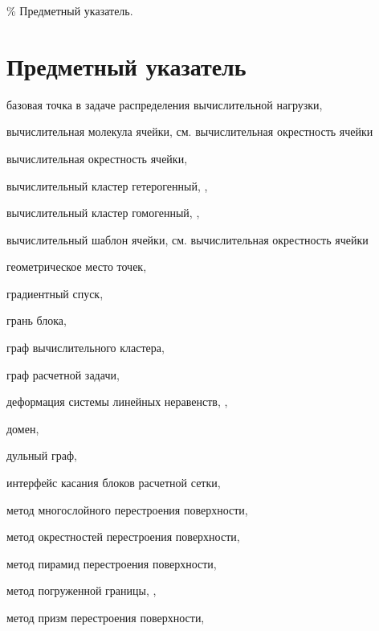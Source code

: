 \% Предметный указатель.
\newpage

\section*{Предметный указатель}

базовая точка в задаче распределения вычислительной нагрузки, \pageref{term:distr_base_point}

вычислительная молекула ячейки, см. вычислительная окрестность ячейки

вычислительная окрестность ячейки, \pageref{term:cell_calc_template}

вычислительный кластер гетерогенный, \pageref{term:cluster_getero}, \pageref{term:cluster_getero2}

вычислительный кластер гомогенный, \pageref{term:cluster_gomo}, \pageref{term:cluster_gomo2}

вычислительный шаблон ячейки, см. вычислительная окрестность ячейки

геометрическое место точек, \pageref{term:gmt}

градиентный спуск, \pageref{term:gradient_spusk}

грань блока, \pageref{term:block_facet}

граф вычислительного кластера, \pageref{term:graph_cluster}

граф расчетной задачи, \pageref{term:graph_task}

деформация системы линейных неравенств, \pageref{term:deform_sys_lin_neravenstv}, \pageref{term:deform_sys_lin_neravenstv2}

домен, \pageref{term:domain}

дульный граф, \pageref{term:dual_graph}

интерфейс касания блоков расчетной сетки, \pageref{term:block_interface}

метод многослойного перестроения поверхности, \pageref{term:method_remesh_multi}

метод окрестностей перестроения поверхности, \pageref{term:method_remesh_okr}

метод пирамид перестроения поверхности, \pageref{term:method_remesh_pyramid}

метод погруженной границы, \pageref{term:immersed_boundary_method}, \pageref{term:immersed_boundary_method2}

метод призм перестроения поверхности, \pageref{term:method_remesh_prism}

